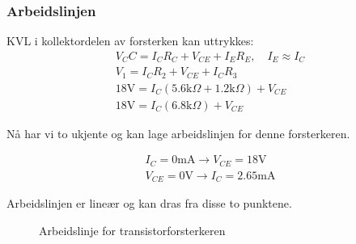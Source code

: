 \subsubsection{Arbeidslinjen}
KVL i kollektordelen av forsterken kan uttrykkes:
\begin{gather*}
    V_CC = I_C R_C + V_{CE} + I_E R_E, \quad I_E \approx I_C \\
    V_1 = I_C R_2 + V_{CE} + I_C R_3 \\
    18\text{V} = I_C \left(5.6\text{k}\Omega + 1.2\text{k}\Omega\right) + V_{CE} \\
    18\text{V} = I_C \left(6.8\text{k}\Omega \right) + V_{CE}
\end{gather*}

\noindent
Nå har vi to ukjente og kan lage arbeidslinjen for denne forsterkeren.

\begin{gather*}
    I_C = 0\text{mA} \rightarrow V_{CE} = 18\text{V} \\
    V_{CE} = 0\text{V} \rightarrow I_C = 2.65\text{mA}
\end{gather*}

\noindent
Arbeidslinjen er lineær og kan dras fra disse to punktene.

\begin{figure}[H]
\centering
{}
\caption{Arbeidslinje for transistorforsterkeren}
\end{figure}